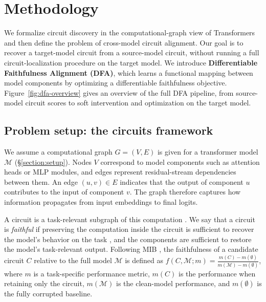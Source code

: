 \documentclass{article} %
\begin{document}
\section{Methodology}



We formalize circuit discovery in the computational-graph view of Transformers and then define the problem of cross-model circuit alignment. Our goal is to recover a target-model circuit from a source-model circuit, without running a full circuit-localization procedure on the target model. We introduce \textbf{Differentiable Faithfulness Alignment (DFA)}, which learns a functional mapping between model components by optimizing a differentiable faithfulness objective. Figure~\ref{fig:dfa-overview} gives an overview of the full DFA pipeline, from source-model circuit scores to soft intervention and optimization on the target model.



\subsection{Problem setup: the circuits framework}







We assume a computational graph $G=(V,E)$ is given for a transformer model $\mathcal{M}$ (\S\ref{section:setup}). Nodes $V$ correspond to model components such as attention heads or MLP modules, and edges represent residual-stream dependencies between them. An edge $(u,v)\in E$ indicates that the output of component $u$ contributes to the input of component $v$. The graph therefore captures how information propagates from input embeddings to final logits.



A circuit is a task-relevant subgraph of this computation \citep{elhage2021mathematical}. We say that a circuit is \emph{faithful} if preserving the computation inside the circuit is sufficient to recover the model's behavior on the task \citep{wang2022interpretability,hanna2024eapig}, and the components are sufficient to restore the model's task-relevant output. Following MIB \citep{mib-2025}, the faithfulness of a candidate circuit $C$ relative to the full model $\mathcal{M}$ is defined as $ f(C,\mathcal{M};m)=\frac{m(C)-m(\emptyset)}{m(\mathcal{M})-m(\emptyset)}$, where $m$ is a task-specific performance metric, $m(C)$ is the performance when retaining only the circuit, $m(\mathcal{M})$ is the clean-model performance, and $m(\emptyset)$ is the fully corrupted baseline. %
\end{document}

